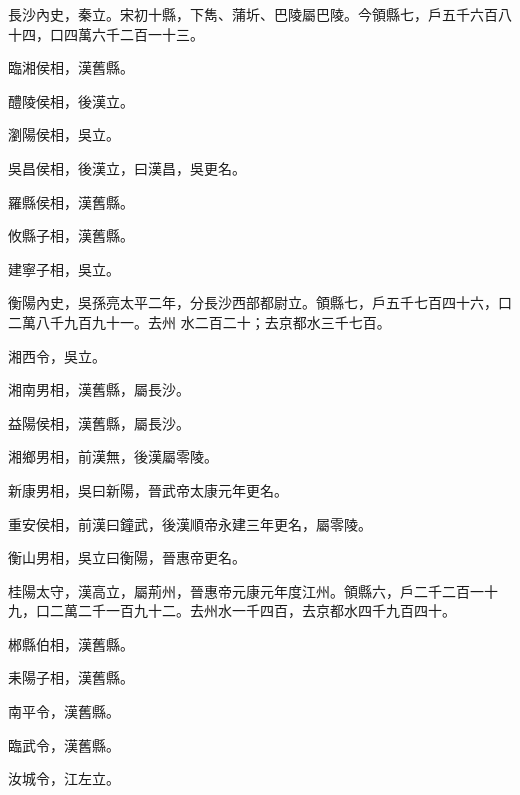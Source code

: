 \begin{pinyinscope}
 長沙內史，秦立。宋初十縣，下雋、蒲圻、巴陵屬巴陵。今領縣七，戶五千六百八十四，口四萬六千二百一十三。



 臨湘侯相，漢舊縣。



 醴陵侯相，後漢立。



 瀏陽侯相，吳立。



 吳昌侯相，後漢立，曰漢昌，吳更名。



 羅縣侯相，漢舊縣。



 攸縣子相，漢舊縣。



 建寧子相，吳立。



 衡陽內史，吳孫亮太平二年，分長沙西部都尉立。領縣七，戶五千七百四十六，口二萬八千九百九十一。去州
 水二百二十；去京都水三千七百。



 湘西令，吳立。



 湘南男相，漢舊縣，屬長沙。



 益陽侯相，漢舊縣，屬長沙。



 湘鄉男相，前漢無，後漢屬零陵。



 新康男相，吳曰新陽，晉武帝太康元年更名。



 重安侯相，前漢曰鐘武，後漢順帝永建三年更名，屬零陵。



 衡山男相，吳立曰衡陽，晉惠帝更名。



 桂陽太守，漢高立，屬荊州，晉惠帝元康元年度江州。領縣六，戶二千二百一十九，口二萬二千一百九十二。去州水一千四百，去京都水四千九百四十。



 郴縣伯相，漢舊縣。



 耒陽子相，漢舊縣。



 南平令，漢舊縣。



 臨武令，漢舊縣。



 汝城令，江左立。




\end{pinyinscope}
